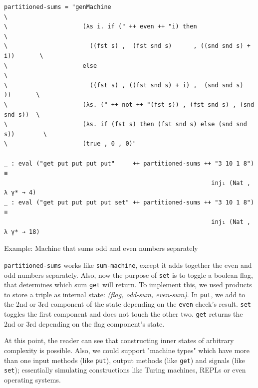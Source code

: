 \begin{listing}[H]
\begin{verbatim}
partitioned-sums = "genMachine                                                  \
\                     (λs i. if (" ++ even ++ "i) then                          \
\                       ((fst s) ,  (fst snd s)      , ((snd snd s) + i))       \
\                     else                                                      \
\                       ((fst s) , ((fst snd s) + i) ,  (snd snd s)    ))       \
\                     (λs. (" ++ not ++ "(fst s)) , (fst snd s) , (snd snd s))  \
\                     (λs. if (fst s) then (fst snd s) else (snd snd s))        \
\                     (true , 0 , 0)"

_ : eval ("get put put put put"     ++ partitioned-sums ++ "3 10 1 8") ≡
                                                          inj₁ (Nat , λ γ* → 4)
_ : eval ("get put put put put set" ++ partitioned-sums ++ "3 10 1 8") ≡
                                                          inj₁ (Nat , λ γ* → 18)
\end{verbatim}
\caption{Example: Machine that sums odd and even numbers separately}
\label{code:examples-machines-2}
\end{listing}

\verb$partitioned-sums$ works like \verb$sum-machine$, except it adds together the even and odd numbers separately. Also, now the purpose of \verb$set$ is to toggle a boolean flag, that determines which sum \verb$get$ will return. To implement this, we used products to store a triple as internal state: \textit{(flag, odd-sum, even-sum)}. In \verb$put$, we add to the 2nd or 3rd component of the state depending on the \verb$even$ check's result. \verb$set$ toggles the first component and does not touch the other two. \verb$get$ returns the 2nd or 3rd depending on the flag component's state.

At this point, the reader can see that constructing inner states of arbitrary complexity is possible. Also, we could support "machine types" which have more than one input methods (like \verb$put$), output methods (like \verb$get$) and signals (like \verb$set$); essentially simulating constructions like Turing machines, REPLs or even operating systems.

